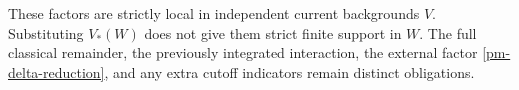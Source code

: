 \documentclass[11pt]{article}
\begin{document}
These factors are strictly local in independent current
backgrounds $V$. Substituting $V_*(W)$ does not give them
strict finite support in $W$. The full classical remainder,
the previously integrated interaction, the external factor
\eqref{pm-delta-reduction}, and any extra cutoff indicators
remain distinct obligations.
\end{document}
